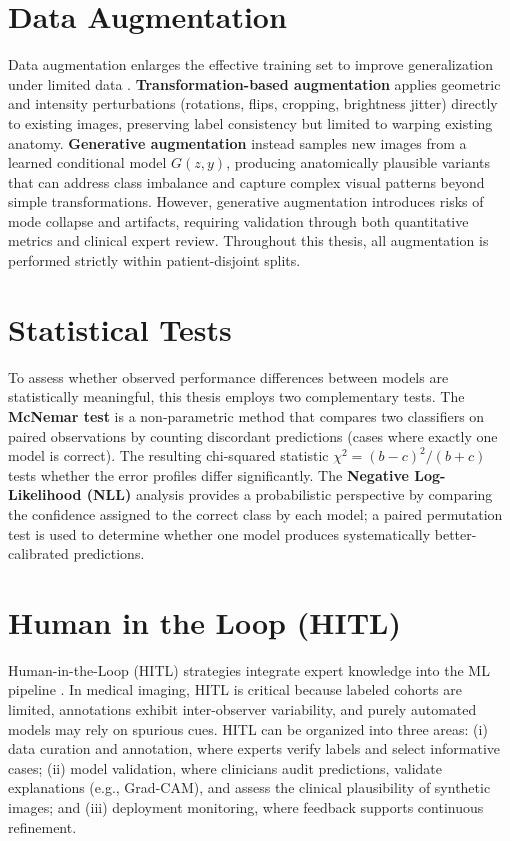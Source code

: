 \section{Data Augmentation}

Data augmentation enlarges the effective training set to improve generalization under limited data \cite{kumar2025enhancingimageclassificationaugmentation}. \textbf{Transformation-based augmentation} applies geometric and intensity perturbations (rotations, flips, cropping, brightness jitter) directly to existing images, preserving label consistency but limited to warping existing anatomy. \textbf{Generative augmentation} instead samples new images from a learned conditional model $G(z, y)$, producing anatomically plausible variants that can address class imbalance and capture complex visual patterns beyond simple transformations. However, generative augmentation introduces risks of mode collapse and artifacts, requiring validation through both quantitative metrics and clinical expert review. Throughout this thesis, all augmentation is performed strictly within patient-disjoint splits.

\section{Statistical Tests}

To assess whether observed performance differences between models are statistically meaningful, this thesis employs two complementary tests. The \textbf{McNemar test} \cite{mcnemar1947note} is a non-parametric method that compares two classifiers on paired observations by counting discordant predictions (cases where exactly one model is correct). The resulting chi-squared statistic $\chi^2 = (b-c)^2/(b+c)$ tests whether the error profiles differ significantly. The \textbf{Negative Log-Likelihood (NLL)} analysis provides a probabilistic perspective by comparing the confidence assigned to the correct class by each model; a paired permutation test is used to determine whether one model produces systematically better-calibrated predictions.




\section{Human in the Loop (HITL)}

Human-in-the-Loop (HITL) strategies integrate expert knowledge into the ML pipeline \cite{wu2022survey}. In medical imaging, HITL is critical because labeled cohorts are limited, annotations exhibit inter-observer variability, and purely automated models may rely on spurious cues. HITL can be organized into three areas: (i) data curation and annotation, where experts verify labels and select informative cases; (ii) model validation, where clinicians audit predictions, validate explanations (e.g., Grad-CAM), and assess the clinical plausibility of synthetic images; and (iii) deployment monitoring, where feedback supports continuous refinement.

